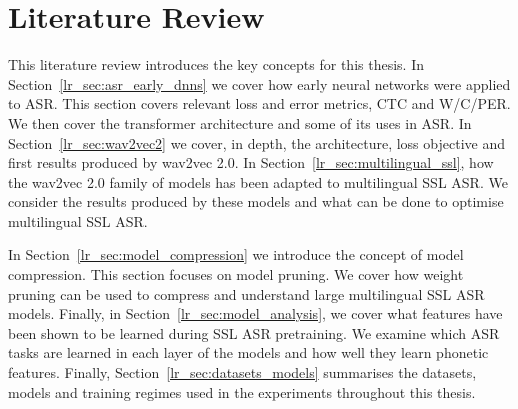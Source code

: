 \chapter[Literature Review]{Literature Review}\label{Chapter2_LR}

\ifpdf
    \graphicspath{{Chapter2/Figs/Raster/}{Chapter2/Figs/PDF/}{Chapter2/Figs/}}
\else
    \graphicspath{{Chapter2/Figs/Vector/}{Chapter2/Figs/}}
\fi


This literature review introduces the key concepts for this thesis. In Section~\ref{lr_sec:asr_early_dnns} we cover how early neural networks were applied to ASR. This section covers relevant loss and error metrics, CTC and W/C/PER. We then cover the transformer architecture and some of its uses in ASR. In Section~\ref{lr_sec:wav2vec2} we cover, in depth, the architecture, loss objective and first results produced by wav2vec 2.0. In Section~\ref{lr_sec:multilingual_ssl}, how the wav2vec 2.0 family of models has been adapted to multilingual SSL ASR. We consider the results produced by these models and what can be done to optimise multilingual SSL ASR. 

In Section~\ref{lr_sec:model_compression} we introduce the concept of model compression. This section focuses on model pruning. We cover how weight pruning can be used to compress and understand large multilingual SSL ASR models. Finally, in Section~\ref{lr_sec:model_analysis}, we cover what features have been shown to be learned during SSL ASR pretraining. We examine which ASR tasks are learned in each layer of the models and how well they learn phonetic features. Finally, Section~\ref{lr_sec:datasets_models} summarises the datasets, models and training regimes used in the experiments throughout this thesis.


